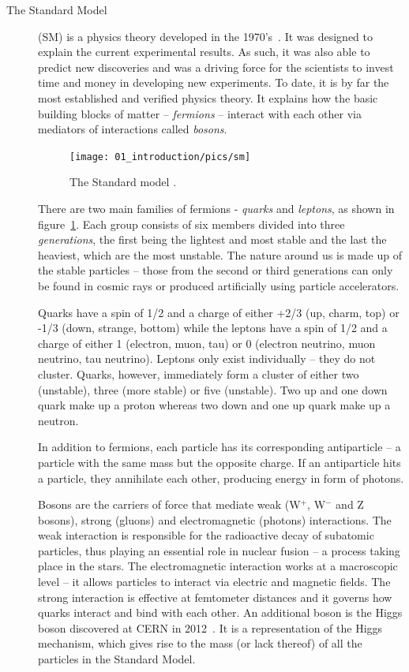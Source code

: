 \begin{description}
\item[The Standard Model]
(SM) is a physics theory developed in the 1970's~\cite{Novaes:1999yn}. It was designed to explain the current experimental results. As such, it was also able to predict new discoveries and was a driving force for the scientists to invest time and money in developing new experiments. To date, it is by far the most established and verified physics theory. It explains how the basic building blocks of matter -- \emph{fermions} -- interact with each other via mediators of interactions called \emph{bosons}.  
\begin{figure}[!t]
\centering
\texttt{[image: 01\_introduction/pics/sm]}
\caption{The Standard model \cite{Dominguez:2002395}.}
\label{fig:sm1}
\end{figure}
There are two main families of fermions - \emph{quarks} and \emph{leptons}, as shown in figure~\ref{fig:sm1}. Each group consists of six members divided into three \emph{generations}, the first being the lightest and most stable and the last the heaviest, which are the most unstable. The nature around us is made up of the stable particles -- those from the second or third generations can only be found in cosmic rays or produced artificially using particle accelerators.

Quarks have a spin of 1/2 and a charge of either +2/3 (up, charm, top)  or -1/3  (down, strange, bottom) while the leptons have a spin of 1/2  and a charge of either 1 (electron, muon, tau) or 0 (electron neutrino, muon neutrino, tau neutrino). Leptons only exist individually -- they do not cluster. Quarks, however, immediately form a cluster of either two (unstable), three (more stable) or five (unstable). Two up and one down quark make up a proton whereas two down and one up quark make up a neutron.

In addition to fermions, each particle has its corresponding antiparticle -- a particle with the same mass but the opposite charge. If an antiparticle hits a particle, they annihilate each other, producing energy in form of photons. 

Bosons are the carriers of force that mediate weak (W$^+$, W$^-$ and Z bosons), strong (gluons) and electromagnetic (photons) interactions. The weak interaction is responsible for the radioactive decay of subatomic particles, thus playing an essential role in nuclear fusion -- a process taking place in the stars. The electromagnetic interaction works at a macroscopic level -- it allows particles to interact via electric and magnetic fields. The strong interaction is effective at femtometer distances and it governs how quarks interact and bind with each other. An additional boson is the Higgs boson discovered at CERN in 2012~\cite{}. It is a representation of the Higgs mechanism, which gives rise to the mass (or lack thereof) of all the particles in the Standard Model.
\end{description}

